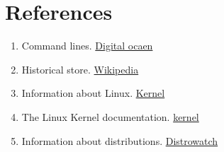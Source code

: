 \documentclass[12pt, a4paper]{article}
\begin{document}
\newpage


\section{References}
\begin{enumerate}

    \item Command lines. \href{https://www.digitalocean.com/community/tutorials/linux-commands}{ Digital ocaen }
    \item Historical store. \href{https://en.wikipedia.org/wiki/Linus_Torvalds}{ Wikipedia }
    \item Information about Linux. \href{https://kernel.org/category/about.html}{ Kernel }
    \item The Linux Kernel documentation. \href{https://kernel.org/doc/html/latest/}{ kernel }
    \item Information about distributions. \href{https://distrowatch.com/}{ Distrowatch }
    
\end{enumerate}
\end{document}
